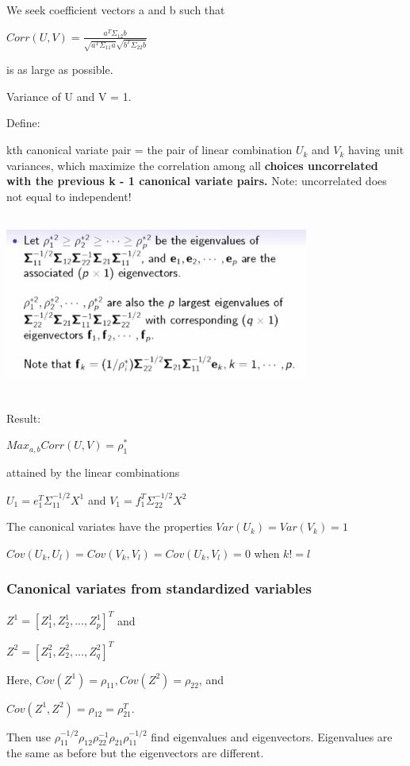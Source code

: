 \documentclass[a4paper]{article}
\begin{document}
We seek coefficient vectors a and b such that

$Corr(U,V) = \frac{a^T\Sigma_{12}b}{\sqrt{a^T\Sigma_{11}a}\sqrt{b^T\Sigma_{22}b}}$

is as large as possible.

Variance of U and V = 1.


Define:

kth canonical variate pair = the pair of linear combination $U_k$ and $V_k$ having
unit variances, which maximize the correlation among all {\bf choices uncorrelated with
the previous k - 1 canonical variate pairs.}
Note: uncorrelated does not equal to independent!
\begin{center}
\includegraphics[width=10cm, height=6cm]{eig.png}
\end{center}

Result:

$Max_{a,b} Corr(U,V) = \rho^*_1$

attained by the linear combinations

$U_1 = e_1^T \Sigma_{11}^{-1/2}X^1$ and $V_1 = f_1^T \Sigma_{22}^{-1/2} X^2$

The canonical variates have the properties
$Var(U_k) = Var(V_k) = 1$

$Cov(U_k,U_l) = Cov(V_k,V_l) = Cov(U_k,V_l) = 0$ when $k != l$

\subsubsection{Canonical variates from standardized variables}

$Z^1 = [Z_1^1,Z_2^1,...,Z_p^1]^T$ and

$Z^2 = [Z_1^2, Z_2^2,...,Z_q^2]^T$

Here, $Cov(Z^1) = \rho_{11}, Cov(Z^2) = \rho_{22}$, and

$Cov(Z^1,Z^2) = \rho_{12}=\rho_{21}^T$.

Then use
$\rho_{11}^{-1/2}\rho_{12}\rho_{22}^{-1}\rho_{21}\rho_{11}^{-1/2}$
find eigenvalues and eigenvectors. Eigenvalues are the same as before but the eigenvectors are different.
\end{document}
